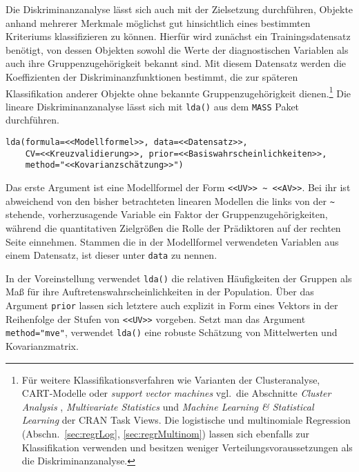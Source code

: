 Die Diskriminanzanalyse lässt sich auch mit der Zielsetzung durchführen, Objekte anhand mehrerer Merkmale möglichst gut hinsichtlich eines bestimmten Kriteriums klassifizieren zu können. Hierfür wird zunächst ein Trainingsdatensatz benötigt, von dessen Objekten sowohl die Werte der diagnostischen Variablen als auch ihre Gruppenzugehörigkeit bekannt sind. Mit diesem Datensatz werden die Koeffizienten der Diskriminanzfunktionen bestimmt, die zur späteren Klassifikation anderer Objekte ohne bekannte Gruppenzugehörigkeit dienen.\footnote{\label{ftn:classification}Für weitere Klassifikationsverfahren wie Varianten der Clusteranalyse, CART-Modelle oder \emph{support vector machines} vgl.\ die Abschnitte \emph{Cluster Analysis} \cite{CRANtvCluster}, \emph{Multivariate Statistics} \cite{CRANtvMultivariate} und \emph{Machine Learning \& Statistical Learning} \cite{CRANtvMachine} der CRAN Task Views. Die logistische und multinomiale Regression (Abschn.\ \ref{sec:regrLog}, \ref{sec:regrMultinom}) lassen sich ebenfalls zur Klassifikation verwenden und besitzen weniger Verteilungsvoraussetzungen als die Diskriminanzanalyse.} Die lineare Diskriminanzanalyse lässt sich mit \lstinline!lda()! aus dem \lstinline!MASS! Paket durchführen.
\begin{lstlisting}
lda(formula=<<Modellformel>>, data=<<Datensatz>>,
    CV=<<Kreuzvalidierung>>, prior=<<Basiswahrscheinlichkeiten>>,
    method="<<Kovarianzschätzung>>")
\end{lstlisting}

Das erste Argument ist eine Modellformel der Form \lstinline!<<UV>> ~ <<AV>>!. Bei ihr ist abweichend von den bisher betrachteten linearen Modellen die links von der \lstinline!~! stehende, vorherzusagende Variable ein Faktor der Gruppenzugehörigkeiten, während die quantitativen Zielgrößen die Rolle der Prädiktoren auf der rechten Seite einnehmen. Stammen die in der Modellformel verwendeten Variablen aus einem Datensatz, ist dieser unter \lstinline!data! zu nennen.

In der Voreinstellung verwendet \lstinline!lda()! die relativen Häufigkeiten der Gruppen als Maß für ihre Auftretenswahrscheinlichkeiten in der Population. Über das Argument \lstinline!prior! lassen sich letztere auch explizit in Form eines Vektors in der Reihenfolge der Stufen von \lstinline!<<UV>>! vorgeben. Setzt man das Argument \lstinline!method="mve"!, verwendet \lstinline!lda()! eine robuste Schätzung von Mittelwerten und Kovarianzmatrix.


